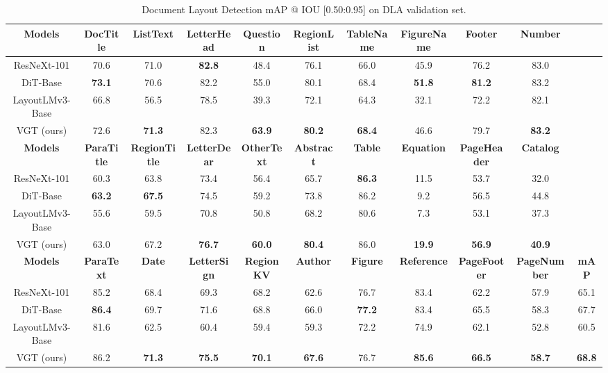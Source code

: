 \documentclass[10pt,twocolumn,letterpaper]{article}
\newcommand{\ra}[1]{\renewcommand{\arraystretch}{#1}}
\begin{document}
\begin{table*}[t]\centering
\footnotesize
\setlength{\tabcolsep}{2.5pt}
\ra{1.2}
\caption{Document Layout Detection mAP @ IOU [0.50:0.95] on DLA validation set.}
\label{tab:V12}
\begin{tabular}{|c|c|c|c|c|c|c|c|c|c|c|}
\hline
\textbf{Models}  & \textbf{DocTitle} & \textbf{ListText} & \textbf{LetterHead} & \textbf{Question} & \textbf{RegionList}  &\textbf{TableName}  &\textbf{FigureName}  &\textbf{Footer} &\textbf{Number} & \\
\hline
ResNeXt-101  &70.6  &71.0  &\textbf{82.8} &48.4  &76.1  &66.0  &45.9   &76.2  &83.0  &\\
DiT-Base &\textbf{73.1}  &70.6  &82.2 	&55.0  &80.1  &68.4  &\textbf{51.8}   &\textbf{81.2}  &83.2  & \\
LayoutLMv3-Base &66.8  &56.5  &78.5  &39.3  &72.1  &64.3  &32.1   &72.2  &82.1  &\\
VGT (ours)&72.6  &\textbf{71.3}  &82.3	&\textbf{63.9}  &\textbf{80.2}  &\textbf{68.4}  &46.6  &79.7  &\textbf{83.2}  &\\
\hline
\textbf{Models}  &\textbf{ParaTitle} & \textbf{RegionTitle} &\textbf{LetterDear}   &\textbf{OtherText}  & \textbf{Abstract} &\textbf{Table} & \textbf{Equation}  & \textbf{PageHeader}  & \textbf{Catalog} &\\
\hline
ResNeXt-101 &60.3  &63.8  &73.4  &56.4  &65.7  &\textbf{86.3}  &11.5   &53.7  &32.0 & \\
DiT-Base &\textbf{63.2}  &\textbf{67.5}  &74.5 	&59.2  &73.8  &86.2  &9.2  &56.5  &44.8 &  \\
LayoutLMv3-Base &55.6  &59.5  &70.8 &50.8  &68.2  &80.6  &7.3   &53.1  &37.3 & \\
VGT (ours) &63.0  &67.2  &\textbf{76.7} &\textbf{60.0}  &\textbf{80.4}  &86.0  &\textbf{19.9}   &\textbf{56.9}  &\textbf{40.9} & \\
\hline
\textbf{Models}  &\textbf{ParaText} & \textbf{Date} &\textbf{LetterSign}   &\textbf{RegionKV}  & \textbf{Author} &\textbf{Figure} & \textbf{Reference}  & \textbf{PageFooter}  & \textbf{PageNumber} & \textbf{mAP} \\
\hline
ResNeXt-101  &85.2  &68.4  &69.3 	&68.2  &62.6  &76.7  &83.4   &62.2  &57.9  & 65.1 \\
DiT-Base  &\textbf{86.4}  &69.7  &71.6 	&68.8  &66.0  &\textbf{77.2} &83.4  &65.5  &58.3 & 67.7\\
LayoutLMv3-Base  &81.6  &62.5  &60.4 	&59.4  &59.3  &72.2  &74.9   &62.1  &52.8  & 60.5 \\
VGT (ours) &86.2  &\textbf{71.3}  &\textbf{75.5 }	&\textbf{70.1 } &\textbf{67.6}  &76.7  &\textbf{85.6}   &\textbf{66.5}  &\textbf{58.7}  &  \textbf{68.8}  \\
\hline
\end{tabular}
\end{table*}
\end{document}
